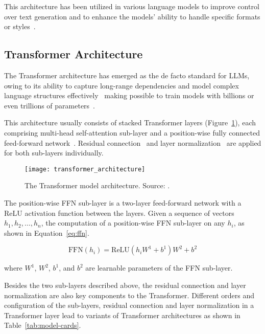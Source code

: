 This architecture has been utilized in various language models to improve control over text generation and to enhance the models' ability to handle specific formats or styles~\cite{raffel2023exploring}.

\subsection{Transformer Architecture}
\label{subsec:transformer-architecture}

The Transformer architecture has emerged as the de facto standard for LLMs, owing to its ability to capture long-range dependencies and model complex language structures effectively~\cite{vaswani2023attention} making possible to train models with billions or even trillions of parameters~\cite{brown2020language, touvron2023llama}.

This architecture usually consists of stacked Transformer layers (Figure~\ref{fig:architecture}), each comprising multi-head self-attention sub-layer and a position-wise fully connected feed-forward network~\cite{vaswani2023attention}.
Residual connection~\cite{he2016deep} and layer normalization~\cite{ba2016layer} are applied for both sub-layers individually.

\begin{figure}[H]
	\centering
	\texttt{[image: transformer\_architecture]}
	\caption{The Transformer model architecture. Source: \textcite{vaswani2023attention}.}
	\label{fig:architecture}
\end{figure}

The position-wise FFN sub-layer is a two-layer feed-forward network with a ReLU activation function between the layers.
Given a sequence of vectors \(h_1, h_2, \ldots, h_n\), the computation of a position-wise FFN sub-layer on any \(h_i\), as shown in Equation~\ref{eq:ffn}.

\begin{equation}
	\text{FFN}(h_i) = \text{ReLU}(h_{i}W^1 + b^1)W^2 + b^2
	\label{eq:ffn}
\end{equation}

\noindent where \(W^1\), \(W^2\), \(b^1\), and \(b^2\) are learnable parameters of the FFN sub-layer.

Besides the two sub-layers described above, the residual connection and layer normalization are also key components to the
Transformer.
Different orders and configuration of the sub-layers, residual connection and layer normalization in a Transformer layer lead to variants of Transformer architectures as shown in Table~\ref{tab:model-cards}.


